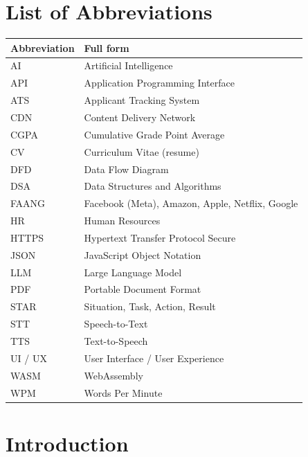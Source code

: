 \documentclass[12pt,a4paper,oneside]{report}
\begin{document}
\tableofcontents
\listoffigures
\listoftables

\chapter*{List of Abbreviations}
\thispagestyle{plain}
\begin{tabularx}{\textwidth}{@{}lY@{}}
\toprule
\textbf{Abbreviation} & \textbf{Full form} \\
\midrule
AI & Artificial Intelligence \\
API & Application Programming Interface \\
ATS & Applicant Tracking System \\
CDN & Content Delivery Network \\
CGPA & Cumulative Grade Point Average \\
CV & Curriculum Vitae (resume) \\
DFD & Data Flow Diagram \\
DSA & Data Structures and Algorithms \\
FAANG & Facebook (Meta), Amazon, Apple, Netflix, Google \\
HR & Human Resources \\
HTTPS & Hypertext Transfer Protocol Secure \\
JSON & JavaScript Object Notation \\
LLM & Large Language Model \\
PDF & Portable Document Format \\
STAR & Situation, Task, Action, Result \\
STT & Speech-to-Text \\
TTS & Text-to-Speech \\
UI / UX & User Interface / User Experience \\
WASM & WebAssembly \\
WPM & Words Per Minute \\
\bottomrule
\end{tabularx}

\clearpage
{}

\chapter{Introduction}
\end{document}

